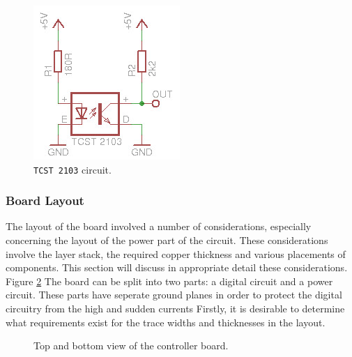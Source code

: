 \begin{figure}
	\centering
	\includegraphics[width=0.4\linewidth]{graphics/tcst_circuit_temp.jpg}
	\caption{\texttt{TCST 2103} circuit.}
	\label{fig:tcst_circuit}
\end{figure}

\subsubsection{Board Layout} %
\label{sub:board_layout}
The layout of the board involved a number of considerations, especially concerning the layout of the power part of the circuit.
These considerations involve the layer stack, the required copper thickness and various placements of components.
This section will discuss in appropriate detail these considerations.
Figure \ref{fig:board_layout} 
The board can be split into two parts: a digital circuit and a power circuit.
These parts have seperate ground planes in order to protect the digital circuitry from the high and sudden currents
Firstly, it is desirable to determine what requirements exist for the trace widths and thicknesses in the layout.

\begin{figure}
	\centering
	\caption{Top and bottom view of the controller board.}
	\label{fig:board_layout}
\end{figure}

